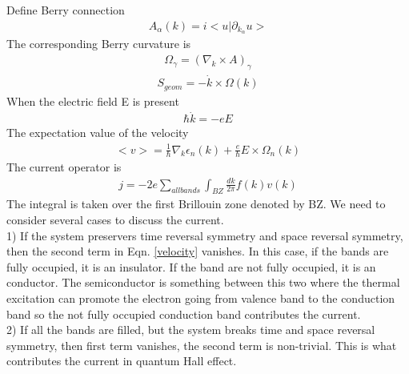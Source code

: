 \documentclass[a4paper]{article}
\begin{document}
Define Berry connection
\begin{align*}
A_{\alpha}(k) = i<u|\partial_{k_{\alpha}}u>
\end{align*}
The corresponding Berry curvature is
\begin{align*}
\Omega_{\gamma} = (\nabla_k \times A)_{\gamma}
\end{align*}
\begin{align*}
S_{geom} = - \dot k \times \Omega(k)
\end{align*}
When the electric field E is present
\begin{align*}
\hbar \dot k = -e E
\end{align*}
The expectation value of the velocity
\begin{align*}
<v> = \frac{1}{\hbar}\nabla_k \epsilon_n(k) + \frac{e}{\hbar} E \times \Omega_n(k)
\end{align*}
The current operator is
\begin{align*}
	j = -2e\sum_{all bands}\int_{BZ}\frac{dk}{2 \pi} f(k)v(k)
\end{align*}
The integral is taken over the first Brillouin zone denoted by BZ.
We need to consider several cases to discuss the current.\\
1) If the system preservers time reversal symmetry and space reversal symmetry, then the second term in Eqn. \ref{velocity} vanishes. In this case, if the bands are fully occupied, it is an insulator. If the band are not fully occupied, it is an conductor. The semiconductor is something between this two where the thermal excitation can promote the electron going from valence band to the conduction band so the not fully occupied conduction band contributes the current.\\
2) If all the bands are filled, but the system breaks time and space reversal symmetry, then first term vanishes, the second term is non-trivial. This is what contributes the current in quantum Hall effect.\\
\end{document}
